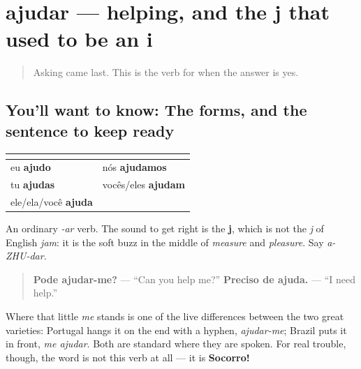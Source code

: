 \section[ajudar]{ajudar — helping, and the j that used to be an i}

\label{lesson:PT-C19-ajudar}



\begin{quote}
Asking came last. This is the verb for when the answer is yes.
\end{quote}

\subsection*{You'll want to know: The forms, and the sentence to keep ready}
\noindent
\begin{tabularx}{\linewidth}{@{}>{\raggedright\arraybackslash}X>{\raggedright\arraybackslash}X@{}}
\toprule
\textbf{} & \textbf{} \\
\midrule
eu \textbf{ajudo} & nós \textbf{ajudamos} \\
tu \textbf{ajudas} & vocês/eles \textbf{ajudam} \\
ele/ela/você \textbf{ajuda} &  \\
\bottomrule
\end{tabularx}

An ordinary \emph{-ar} verb. The sound to get right is the \textbf{j}, which is not the \emph{j} of English \emph{jam}: it is the soft buzz in the middle of \emph{measure} and \emph{pleasure}. Say \emph{a-ZHU-dar}.

\begin{quote}
\textbf{Pode ajudar-me?} — \textquotedblleft{}Can you help me?\textquotedblright{} \textbf{Preciso de ajuda.} — \textquotedblleft{}I need help.\textquotedblright{}
\end{quote}

Where that little \emph{me} stands is one of the live differences between the two great varieties: Portugal hangs it on the end with a hyphen, \emph{ajudar-me}; Brazil puts it in front, \emph{me ajudar}. Both are standard where they are spoken. For real trouble, though, the word is not this verb at all — it is \textbf{Socorro!}

